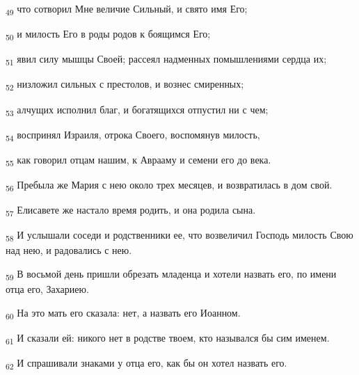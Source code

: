 \begin{tcolorbox}
\textsubscript{49} что сотворил Мне величие Сильный, и свято имя Его;
\end{tcolorbox}
\begin{tcolorbox}
\textsubscript{50} и милость Его в роды родов к боящимся Его;
\end{tcolorbox}
\begin{tcolorbox}
\textsubscript{51} явил силу мышцы Своей; рассеял надменных помышлениями сердца их;
\end{tcolorbox}
\begin{tcolorbox}
\textsubscript{52} низложил сильных с престолов, и вознес смиренных;
\end{tcolorbox}
\begin{tcolorbox}
\textsubscript{53} алчущих исполнил благ, и богатящихся отпустил ни с чем;
\end{tcolorbox}
\begin{tcolorbox}
\textsubscript{54} воспринял Израиля, отрока Своего, воспомянув милость,
\end{tcolorbox}
\begin{tcolorbox}
\textsubscript{55} как говорил отцам нашим, к Аврааму и семени его до века.
\end{tcolorbox}
\begin{tcolorbox}
\textsubscript{56} Пребыла же Мария с нею около трех месяцев, и возвратилась в дом свой.
\end{tcolorbox}
\begin{tcolorbox}
\textsubscript{57} Елисавете же настало время родить, и она родила сына.
\end{tcolorbox}
\begin{tcolorbox}
\textsubscript{58} И услышали соседи и родственники ее, что возвеличил Господь милость Свою над нею, и радовались с нею.
\end{tcolorbox}
\begin{tcolorbox}
\textsubscript{59} В восьмой день пришли обрезать младенца и хотели назвать его, по имени отца его, Захариею.
\end{tcolorbox}
\begin{tcolorbox}
\textsubscript{60} На это мать его сказала: нет, а назвать его Иоанном.
\end{tcolorbox}
\begin{tcolorbox}
\textsubscript{61} И сказали ей: никого нет в родстве твоем, кто назывался бы сим именем.
\end{tcolorbox}
\begin{tcolorbox}
\textsubscript{62} И спрашивали знаками у отца его, как бы он хотел назвать его.
\end{tcolorbox}
